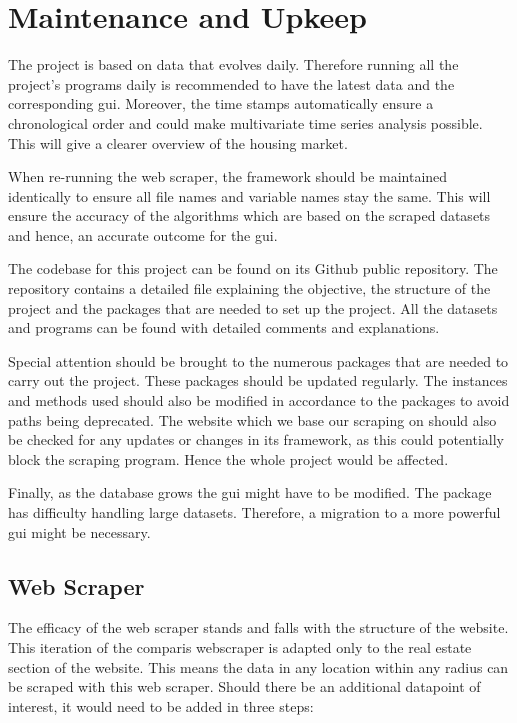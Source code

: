 \documentclass[main]{subfiles}
\begin{document}
\section{Maintenance and Upkeep}

The project is based on data that evolves daily. 
Therefore running all the project's programs daily is recommended to have the latest data and the corresponding \ac{gui}. 
Moreover, the time stamps automatically ensure a chronological order and could make multivariate time series analysis possible.
This will give a clearer overview of the housing market. \par
When re-running the web scraper, the framework should be maintained identically to ensure all file names and variable names stay the same. 
This will ensure the accuracy of the algorithms which are based on the scraped datasets and hence, an accurate outcome for the \ac{gui}. \par
The codebase for this project can be found on its Github public repository. 
The repository contains a detailed \pkg[readme.md] file explaining the objective, 
the structure of the project and the packages that are needed to set up the project. 
All the datasets and programs can be found with detailed comments and explanations.\par
Special attention should be brought to the numerous packages that are needed to carry out the project. 
These packages should be updated regularly. 
The instances and methods used should also be modified in accordance to the packages to avoid paths being deprecated.
The website which we base our scraping on should also be checked for any updates or changes in its framework, 
as this could potentially block the scraping program. Hence the whole project would be affected.\par
Finally, as the database grows the \ac{gui} might have to be modified. 
The \pkg[tkinter] package has difficulty handling large datasets.
Therefore, a migration to a more powerful \ac{gui} might be necessary.

\subsection{Web Scraper}
The efficacy of the web scraper stands and falls with the structure of the website.
This iteration of the comparis webscraper is adapted only to the real estate section of the website.
This means the data in any location within any radius can be scraped with this web scraper.
Should there be an additional datapoint of interest,
it would need to be added in three steps:
\end{document}
